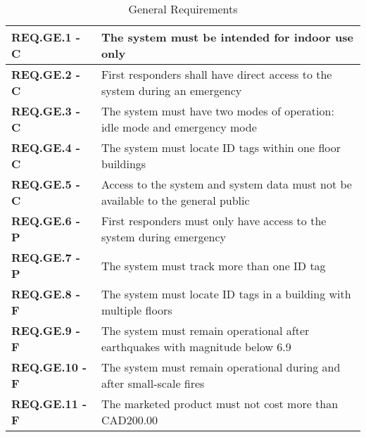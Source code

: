 \documentclass[11pt]{article}
\begin{document}
\bgroup
\def\arraystretch{1.5}
\begin{table}[H]
\centering
\begin{tabular}{ | m{3.5cm} | m{12.5cm} | } 
 \hline
 \textbf{ REQ.GE.1 - C } & The system must be intended for indoor use only \\ 
\hline
 \textbf{ REQ.GE.2 - C } & First responders shall have direct access to the system during an emergency \\ 
\hline
 \textbf{ REQ.GE.3 - C } & The system must have two modes of operation: idle mode and emergency mode \\ 
\hline
 \textbf{ REQ.GE.4 - C } & The system must locate ID tags within one floor buildings \\
\hline
 \textbf{ REQ.GE.5 - C } & Access to the system and system data must not be available to the general public \\
\hline
 \textbf{ REQ.GE.6 - P } & First responders must only have access to the system during emergency \\
\hline
 \textbf{ REQ.GE.7 - P } & The system must track more than one ID tag \\
\hline
 \textbf{ REQ.GE.8 - F } & The system must locate ID tags in a building with multiple floors \\
\hline
 \textbf{ REQ.GE.9 - F } & The system must remain operational after earthquakes with magnitude below 6.9 \\
\hline
 \textbf{ REQ.GE.10 - F } & The system must remain operational during and after small-scale fires \\
\hline
 \textbf{ REQ.GE.11 - F } & The marketed product must not cost more than CAD200.00 \\
\hline
\end{tabular}
\caption{General Requirements}
\end{table}	

\break
\end{document}
